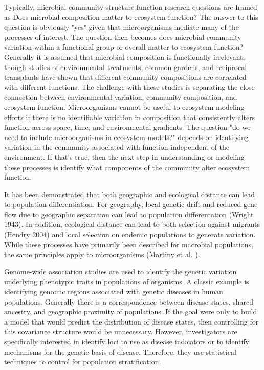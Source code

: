 Typically, microbial community structure-function research questions are framed
as Does microbial composition matter to ecosystem function? The answer to this
question is obviously "yes" given that microorganisms mediate many of the
processes of interest. The question then becomes does microbial community
variation within a functional group or overall matter to ecosystem function? 
Generally it is assumed that microbial composition is functionally irrelevant, 
though studies of environmental treatments, common gardens, and reciprocal
transplants have shown that different community compositions are correlated with
different functions. The challenge with these studies is separating the close
connection between environmental variation, community composition, and ecosystem
function. Microorganisms cannot be useful to ecosystem modeling efforts if there
is no identifiable variation in composition that consistently alters function
across space, time, and environmental gradients. The question "do we need to
include microorganisms in ecosystem models?" depends on identifying variation in
the community associated with function independent of the environment. If that's
true, then the next step in understanding or modeling these processes is 
identify what components of the community alter ecosystem function.

It has been demonstrated that both geographic and ecological distance can lead
to population differentiation. For geography, local genetic
drift and reduced gene flow due to geographic separation can lead to population
differentation (Wright 1943). In addition, ecological distance can lead to both selection
against migrants (Hendry 2004) and local selection on endemic populations to
generate variation. While
these processes have primarily been described for macrobial populations, the
same principles apply to microorganisms (Martiny et al. ). 

Genome-wide association studies are used to identify the genetic variation
underlying phenotypic traits in populations of organisms. A classic example is
identifying genomic regions associated with genetic diseases in human
populations. Generally there is a correspondence between disease states, shared
ancestry, and geographic proximity of populations. If the goal were only to
build a model that would
predict the distribution of disease states, then controlling for this covariance
structure would be unnecessary. However, investigators are specifically
interested in identify loci to use as disease indicators or to identify
mechanisms for the genetic basis of disease. Therefore, they use statistical
techniques to control for population stratification.



